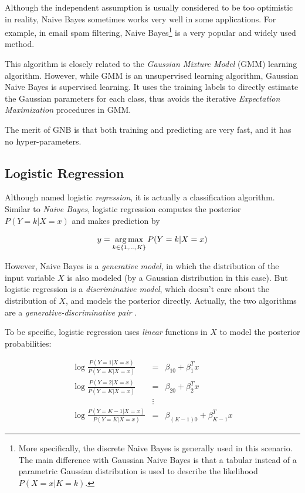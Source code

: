 Although the independent assumption is usually considered to be too optimistic 
in reality, Naive Bayes sometimes works very well in some applications. For 
example, in email spam filtering, Naive Bayes\footnote{More specifically, the 
    discrete Naive Bayes is generally used in this scenario. The main 
    difference with Gaussian Naive Bayes is that a tabular instead of a 
    parametric Gaussian distribution is used to describe the likelihood 
    $P(X=x|K=k)$.} is a very popular and widely used method.

This algorithm is closely related to the \emph{Gaussian Mixture Model} (GMM) learning
algorithm. However, while GMM is an unsupervised learning algorithm, Gaussian
Naive Bayes is supervised learning. It uses the training labels to directly
estimate the Gaussian parameters for each class, thus avoids the iterative
\emph{Expectation Maximization} procedures in GMM.

The merit of GNB is that both training and predicting are very fast, and it has
no hyper-parameters.

\subsection{Logistic Regression}

Although named logistic \emph{regression}, it is actually a classification
algorithm. Similar to \emph{Naive Bayes}, logistic regression computes the
posterior $P(Y=k|X=x)$ and makes prediction by

\[
    y = \operatorname*{arg\,max}_{k\in\{1,\ldots,K\}} P(Y=k|X=x)
\]

However, Naive Bayes is a \emph{generative model}, in which the distribution of
the input variable $X$ is also modeled (by a Gaussian distribution in this
case). But logistic regression is a \emph{discriminative model}, which doesn't
care about the distribution of $X$, and models the posterior directly.
Actually, the two algorithms are a \emph{generative-discriminative pair}
\citep{DBLP:conf/nips/NgJW01}.

To be specific, logistic regression uses \emph{linear} functions in $X$ to model the
posterior probabilities:

\begin{eqnarray}
    \log\frac{P(Y=1|X=x)}{P(Y=K|X=x)} &=& \beta_{10} + \beta_1^Tx \\
    \log\frac{P(Y=2|X=x)}{P(Y=K|X=x)} &=& \beta_{20} + \beta_2^Tx \\
    &\vdots& \nonumber\\
    \log\frac{P(Y=K-1|X=x)}{P(Y=K|X=x)} &=& \beta_{(K-1)0} + \beta_{K-1}^Tx
\end{eqnarray}

